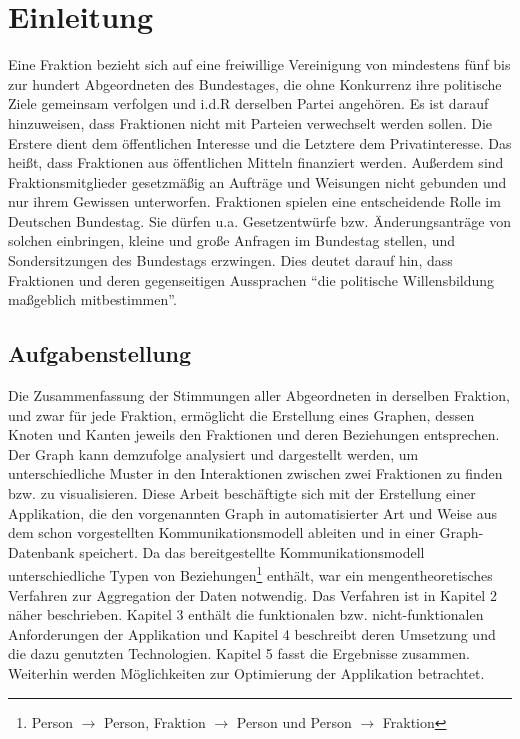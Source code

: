 \section{Einleitung}\label{sec:06_01_einleitung}
Eine Fraktion bezieht sich auf eine freiwillige Vereinigung von mindestens fünf bis zur hundert %
	Abgeordneten des Bundestages, die ohne Konkurrenz
ihre politische Ziele gemeinsam verfolgen und i.d.R derselben Partei angehören.
Es ist darauf hinzuweisen, dass Fraktionen nicht mit Parteien verwechselt werden sollen. Die Erstere dient dem öffentlichen Interesse und die Letztere dem Privatinteresse.
Das heißt, dass Fraktionen aus öffentlichen Mitteln finanziert werden.
Außerdem sind Fraktionsmitglieder gesetzmäßig an Aufträge und Weisungen nicht gebunden und nur ihrem Gewissen unterworfen.\newline 
Fraktionen spielen eine entscheidende Rolle im Deutschen Bundestag. 
Sie dürfen u.a. Gesetzentwürfe bzw. Änderungsanträge von solchen einbringen, kleine und große Anfragen im Bundestag stellen, und Sondersitzungen des Bundestags erzwingen. 
Dies deutet darauf hin, dass Fraktionen und deren gegenseitigen Aussprachen ``die politische Willensbildung maßgeblich mitbestimmen''. 
\subsection{Aufgabenstellung}
Die Zusammenfassung der Stimmungen aller Abgeordneten in derselben Fraktion, und zwar für jede Fraktion, ermöglicht die Erstellung eines Graphen, dessen Knoten und Kanten jeweils den Fraktionen und deren Beziehungen entsprechen. 
Der Graph kann demzufolge analysiert und dargestellt werden, um unterschiedliche Muster in den Interaktionen zwischen zwei Fraktionen zu finden bzw. zu visualisieren.
Diese Arbeit beschäftigte sich mit der Erstellung einer Applikation, die den vorgenannten Graph in automatisierter Art und Weise aus dem schon vorgestellten Kommunikationsmodell ableiten und in einer Graph-Datenbank speichert.\newline 
Da das bereitgestellte Kommunikationsmodell unterschiedliche Typen von Beziehungen\footnote{Person $\rightarrow$ Person, Fraktion $\rightarrow$ Person und Person $\rightarrow$ Fraktion} enthält, war ein mengentheoretisches Verfahren zur Aggregation der Daten notwendig. Das Verfahren ist in Kapitel 2 näher beschrieben. 
Kapitel 3 enthält die funktionalen bzw. nicht-funktionalen Anforderungen der Applikation und Kapitel 4 beschreibt deren Umsetzung und die dazu genutzten Technologien. 
Kapitel 5 fasst die Ergebnisse zusammen. Weiterhin werden Möglichkeiten zur Optimierung der Applikation betrachtet. 
